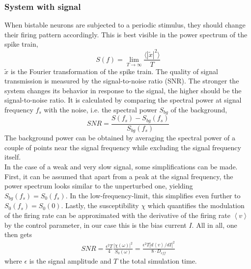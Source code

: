 \documentclass[12pt,a4paper]{article}
\begin{document}
\subsubsection{System with signal}\label{sws}
When bistable neurons are subjected to a periodic stimulus, they should change their firing pattern accordingly. This is best visible in the power spectrum of the spike train, 
\begin{equation}
S(f)=\lim_{T\rightarrow\infty}\frac{\langle|\tilde{x}|^2\rangle}{T}
\end{equation}
$\tilde{x}$ is the Fourier transformation of the spike train. The quality of signal transmission is measured by the signal-to-noise ratio (SNR). The stronger the system changes its behavior in response to the signal, the higher should be the signal-to-noise ratio. It is calculated by comparing the spectral power at signal frequency $f_s$ with the noise, i.e. the spectral power $S_{bg}$ of the background,
\begin{equation}
SNR=\frac{S(f_{s})-S_{bg}(f_{s})}{S_{bg}(f_{s})}
\end{equation}
The background power can be obtained by averaging the spectral power of a couple of points near the signal frequency while excluding the signal frequency itself. 
\\
In the case of a weak and very slow signal, some simplifications can be made. First, it can be assumed that apart from a peak at the signal frequency, the power spectrum looks similar to the unperturbed one, yielding $S_{bg}(f_s)=S_0(f_s)$. In the low-frequency-limit, this simplifies even further to $S_{0}(f_s)=S_0(0)$. Lastly, the susceptibility $\chi$ which quantifies the modulation of the firing rate can be approximated with the derivative of the firing rate $\left<v\right>$ by the control parameter, in our case this is the bias current $I$. All in all, one then gets
\begin{align}\label{snrweaksig}
SNR=\frac{\epsilon ^2T}{4}\frac{|\chi(\omega)|^2}{S_0(\omega)}=\frac{\epsilon^2T|d\left<v\right>/dI|^2}{8\cdot D_{eff}}
\end{align}
where $\epsilon$ is the signal amplitude and $T$ the total simulation time.
\end{document}
